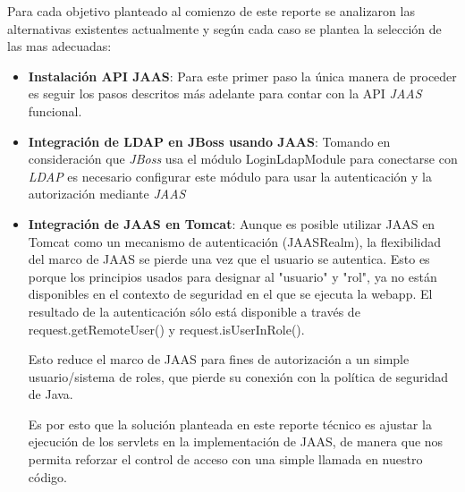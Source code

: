 Para cada objetivo planteado al comienzo de este reporte se analizaron las
alternativas existentes actualmente y según cada caso se plantea la selección
de las mas adecuadas:
\begin{itemize}
	\item \textbf{Instalación API JAAS}: Para este primer paso la única
manera de proceder es seguir los pasos descritos más adelante para contar con
la API \emph{JAAS} funcional.
	\item \textbf{Integración de LDAP en JBoss usando JAAS}: Tomando en
consideración que \emph{JBoss} usa el módulo LoginLdapModule para conectarse
con \emph{LDAP} es necesario configurar este módulo para usar la autenticación y la autorización mediante \emph{JAAS}
	\item \textbf{Integración de JAAS en Tomcat}: Aunque es posible utilizar
JAAS en Tomcat como un mecanismo de autenticación (JAASRealm), la flexibilidad
del marco de JAAS se pierde una vez que el usuario se autentica. Esto es porque
los principios usados para designar al "usuario" y "rol", ya no están disponibles
en el contexto de seguridad en el que se ejecuta la webapp. El resultado de la
autenticación sólo está disponible a través de request.getRemoteUser() y
request.isUserInRole().

Esto reduce el marco de JAAS para fines de autorización a un simple usuario/sistema
de roles, que pierde su conexión con la política de seguridad de Java. 

Es por esto que la solución planteada en este reporte técnico es ajustar la ejecución de los servlets en la implementación de JAAS, de manera que nos permita reforzar el control de acceso con una simple llamada en nuestro código.
\end{itemize}

